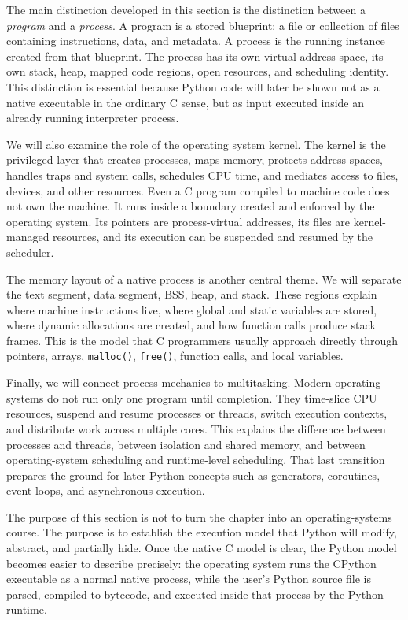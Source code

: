 \documentclass[a4paper,twoside]{report}
\begin{document}
The main distinction developed in this section is the distinction between a \emph{program} and a \emph{process}. A program is a stored blueprint: a file or collection of files containing instructions, data, and metadata. A process is the running instance created from that blueprint. The process has its own virtual address space, its own stack, heap, mapped code regions, open resources, and scheduling identity. This distinction is essential because Python code will later be shown not as a native executable in the ordinary C sense, but as input executed inside an already running interpreter process.

We will also examine the role of the operating system kernel. The kernel is the privileged layer that creates processes, maps memory, protects address spaces, handles traps and system calls, schedules CPU time, and mediates access to files, devices, and other resources. Even a C program compiled to machine code does not own the machine. It runs inside a boundary created and enforced by the operating system. Its pointers are process-virtual addresses, its files are kernel-managed resources, and its execution can be suspended and resumed by the scheduler.

The memory layout of a native process is another central theme. We will separate the text segment, data segment, BSS, heap, and stack. These regions explain where machine instructions live, where global and static variables are stored, where dynamic allocations are created, and how function calls produce stack frames. This is the model that C programmers usually approach directly through pointers, arrays, \texttt{malloc()}, \texttt{free()}, function calls, and local variables.

Finally, we will connect process mechanics to multitasking. Modern operating systems do not run only one program until completion. They time-slice CPU resources, suspend and resume processes or threads, switch execution contexts, and distribute work across multiple cores. This explains the difference between processes and threads, between isolation and shared memory, and between operating-system scheduling and runtime-level scheduling. That last transition prepares the ground for later Python concepts such as generators, coroutines, event loops, and asynchronous execution.

The purpose of this section is not to turn the chapter into an operating-systems course. The purpose is to establish the execution model that Python will modify, abstract, and partially hide. Once the native C model is clear, the Python model becomes easier to describe precisely: the operating system runs the CPython executable as a normal native process, while the user's Python source file is parsed, compiled to bytecode, and executed inside that process by the Python runtime.
\end{document}
